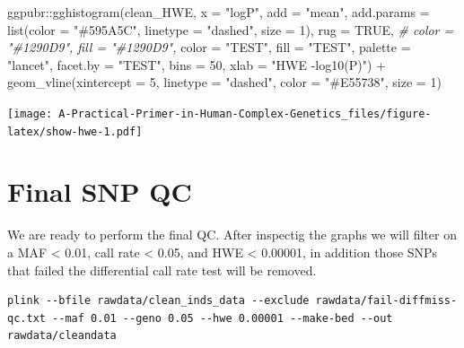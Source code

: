 \documentclass[
]{book}
\newenvironment{Shaded}{\begin{snugshade}}{\end{snugshade}}
\newcommand{\AttributeTok}[1]{\textcolor[rgb]{0.77,0.63,0.00}{#1}}
\newcommand{\CommentTok}[1]{\textcolor[rgb]{0.56,0.35,0.01}{\textit{#1}}}
\newcommand{\ConstantTok}[1]{\textcolor[rgb]{0.00,0.00,0.00}{#1}}
\newcommand{\DecValTok}[1]{\textcolor[rgb]{0.00,0.00,0.81}{#1}}
\newcommand{\FunctionTok}[1]{\textcolor[rgb]{0.00,0.00,0.00}{#1}}
\newcommand{\NormalTok}[1]{#1}
\newcommand{\SpecialCharTok}[1]{\textcolor[rgb]{0.00,0.00,0.00}{#1}}
\newcommand{\StringTok}[1]{\textcolor[rgb]{0.31,0.60,0.02}{#1}}
\begin{document}
\begin{Shaded}
\begin{Highlighting}[]
\NormalTok{ggpubr}\SpecialCharTok{::}\FunctionTok{gghistogram}\NormalTok{(clean\_HWE, }\AttributeTok{x =} \StringTok{"logP"}\NormalTok{,}
                    \AttributeTok{add =} \StringTok{"mean"}\NormalTok{,}
                    \AttributeTok{add.params =} \FunctionTok{list}\NormalTok{(}\AttributeTok{color =} \StringTok{"\#595A5C"}\NormalTok{, }\AttributeTok{linetype =} \StringTok{"dashed"}\NormalTok{, }\AttributeTok{size =} \DecValTok{1}\NormalTok{),}
                    \AttributeTok{rug =} \ConstantTok{TRUE}\NormalTok{,}
                    \CommentTok{\# color = "\#1290D9", fill = "\#1290D9",}
                    \AttributeTok{color =} \StringTok{"TEST"}\NormalTok{, }\AttributeTok{fill =} \StringTok{"TEST"}\NormalTok{,}
                    \AttributeTok{palette =} \StringTok{"lancet"}\NormalTok{,}
                    \AttributeTok{facet.by =} \StringTok{"TEST"}\NormalTok{,}
                    \AttributeTok{bins =} \DecValTok{50}\NormalTok{,}
                    \AttributeTok{xlab =} \StringTok{"HWE {-}log10(P)"}\NormalTok{) }\SpecialCharTok{+}
  \FunctionTok{geom\_vline}\NormalTok{(}\AttributeTok{xintercept =} \DecValTok{5}\NormalTok{, }\AttributeTok{linetype =} \StringTok{"dashed"}\NormalTok{,}
                \AttributeTok{color =} \StringTok{"\#E55738"}\NormalTok{, }\AttributeTok{size =} \DecValTok{1}\NormalTok{)}
\end{Highlighting}
\end{Shaded}

\texttt{[image: A-Practical-Primer-in-Human-Complex-Genetics\_files/figure-latex/show-hwe-1.pdf]}

\hypertarget{final-snp-qc}{%
\section{Final SNP QC}\label{final-snp-qc}}

We are ready to perform the final QC. After inspectig the graphs we will filter on a MAF \textless{} 0.01, call rate \textless{} 0.05, and HWE \textless{} 0.00001, in addition those SNPs that failed the differential call rate test will be removed.

\begin{verbatim}
plink --bfile rawdata/clean_inds_data --exclude rawdata/fail-diffmiss-qc.txt --maf 0.01 --geno 0.05 --hwe 0.00001 --make-bed --out rawdata/cleandata
\end{verbatim}
\end{document}
